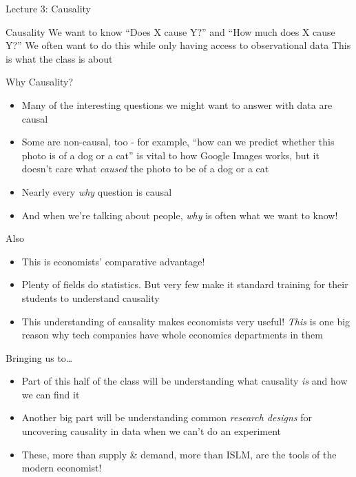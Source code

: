 \documentclass[
  ignorenonframetext,
]{beamer}
\author{}
\date{\vspace{-2.5em}}
\providecommand{\tightlist}{%
  \setlength{\itemsep}{0pt}\setlength{\parskip}{0pt}}
\begin{document}
\begin{frame}

Lecture 3: Causality
\end{frame}

\begin{frame}{Causality}
\label{causality}
We want to know ``Does X cause Y?'' and ``How much does X cause Y?'' We
often want to do this while only having access to observational data
This is what the class is about
\end{frame}

\begin{frame}{Why Causality?}
\label{why-causality}
\begin{itemize}
\tightlist
\item
  Many of the interesting questions we might want to answer with data
  are causal
\item
  Some are non-causal, too - for example, ``how can we predict whether
  this photo is of a dog or a cat'' is vital to how Google Images works,
  but it doesn't care what \emph{caused} the photo to be of a dog or a
  cat
\item
  Nearly every \emph{why} question is causal
\item
  And when we're talking about people, \emph{why} is often what we want
  to know!
\end{itemize}
\end{frame}

\begin{frame}{Also}
\label{also}
\begin{itemize}
\tightlist
\item
  This is economists' comparative advantage!
\item
  Plenty of fields do statistics. But very few make it standard training
  for their students to understand causality
\item
  This understanding of causality makes economists very useful!
  \emph{This} is one big reason why tech companies have whole economics
  departments in them
\end{itemize}
\end{frame}

\begin{frame}{Bringing us to\ldots{}}
\label{bringing-us-to}
\begin{itemize}
\tightlist
\item
  Part of this half of the class will be understanding what causality
  \emph{is} and how we can find it
\item
  Another big part will be understanding common \emph{research designs}
  for uncovering causality in data when we can't do an experiment
\item
  These, more than supply \& demand, more than ISLM, are the tools of
  the modern economist!
\end{itemize}
\end{frame}
\end{document}
